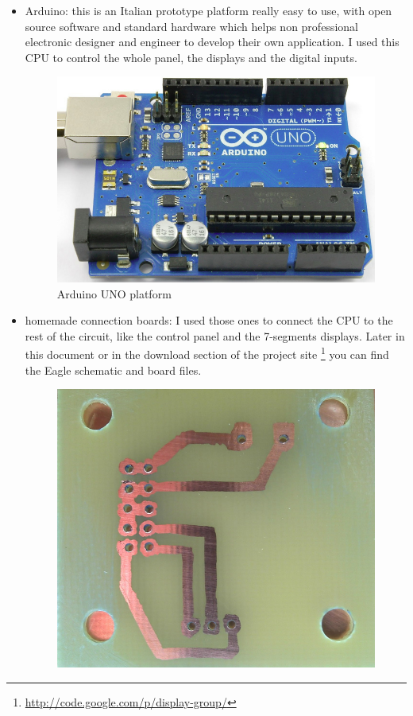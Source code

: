 \documentclass[11pt,english]{article}
\begin{document}
\begin{itemize}
 \item Arduino: this is an Italian prototype platform really easy to use, with open source 
 software and standard hardware which helps non professional electronic designer and engineer 
 to develop their own application. I used this CPU to control the whole panel, the displays 
 and the digital inputs.
 
  \begin{figure}[H]
  \centering\includegraphics[scale=0.25]{img/Arduino}

  \caption{Arduino UNO platform\label{fig:arduino}}

  \end{figure}
 
 \item homemade connection boards: I used those ones to connect the CPU to the rest of the 
 circuit, like the control panel and the 7-segments displays. Later in this document or in the 
 download section of the project site \footnote{\url{http://code.google.com/p/display-group/}}  
 you can find the Eagle schematic and board files.
 
  \begin{figure}[H]
  \centering\includegraphics[scale=0.25]{img/Board}


\end{figure}
\end{itemize}
\end{document}
